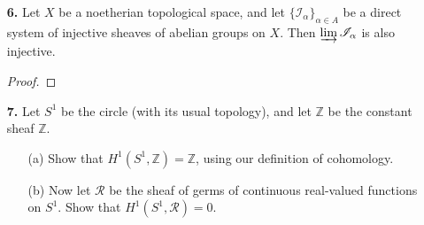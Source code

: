 \documentclass{article}
\newcommand{\fF}{\mathscr{F}}
\newcommand{\fI}{\mathscr{I}}
\newcommand{\fR}{\mathscr{R}}
\newcommand{\fH}{\mathscr{H}}
\newcommand{\Z}{\mathbb{Z}}
\begin{document}
\begin{enumerate} [label=\textbf{\arabic*.}, leftmargin=0em]
\begin{proof}
    There is an exact sequence of sheaves
    \[ \begin{tikzcd}
        & 0 \arrow[d]                                                  & 0 \arrow[d]                        & 0 \arrow[d]                                            &   \\
0 \arrow[r] & \fH^0_{Y_1 \cap Y_2}(\fF) \arrow[r] \arrow[d]                & \fF \arrow[r] \arrow[d]            & \fF_{X - Y_1 \cap Y_2} \arrow[r] \arrow[d]             & 0 \\
0 \arrow[r] & \fH_{Y_1}^0(\fF) \oplus \fH_{Y_2}^0(\fF) \arrow[d] \arrow[r] & \fF \oplus \fF \arrow[d] \arrow[r] & \fF_{X - Y_1} \oplus \fF_{X - Y_2} \arrow[d] \arrow[r] & 0 \\
0 \arrow[r] & \fH^0_{Y_1 \cup Y_2}(\fF) \arrow[d] \arrow[r]                & \fF \arrow[d] \arrow[r]            & \fF_{X - Y_1 \cup Y_2} \arrow[d] \arrow[r]             & 0 \\
        & 0                                                            & 0                                  & 0                                                      &  
\end{tikzcd} \]
which induces the desired long sequence of cohomology with supports by (1.1A).
\end{proof}


\item[\textbf{6.}] Let $X$ be a noetherian topological space, and let $\{ \fI_\alpha \}_{\alpha \in A}$ be a direct system of injective sheaves of abelian groups on $X$. Then $\varinjlim \fI _\alpha$ is also injective.

\begin{proof} 
\end{proof}

\item[\textbf{7.}] Let $S^1$ be the circle (with its usual topology), and let $\Z$ be the constant sheaf $\Z$.
\begin{itemize}
    \item[(a)] Show that $H^1(S^1, \Z) = \Z$, using our definition of cohomology.
    \item[(b)] Now let $\fR$ be the sheaf of germs of continuous real-valued functions on $S^1$. Show that $H^1(S^1, \fR) = 0$.
\end{itemize}


\end{enumerate}
\end{document}
